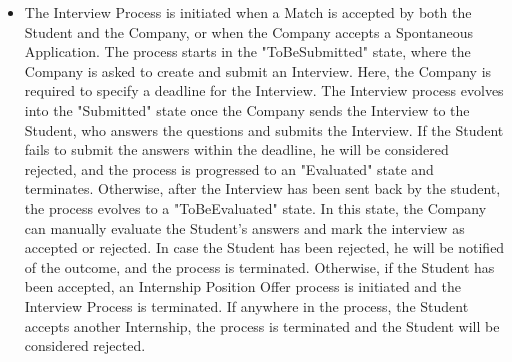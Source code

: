 \begin{itemize}
    \item The Interview Process is initiated when a Match is accepted by both the Student and the Company, or when the Company accepts a Spontaneous Application. The process starts in the "ToBeSubmitted" state, where the Company is asked to create and submit an Interview. Here, the Company is required to specify a deadline for the Interview. The Interview process evolves into the "Submitted" state once the Company sends the Interview to the Student, who answers the questions and submits the Interview. If the Student fails to submit the answers within the deadline, he will be considered rejected, and the process is progressed to an "Evaluated" state and terminates. Otherwise, after the Interview has been sent back by the student, the process evolves to a "ToBeEvaluated" state. In this state, the Company can manually evaluate the Student's answers and mark the interview as accepted or rejected. In case the Student has been rejected, he will be notified of the outcome, and the process is terminated. Otherwise, if the Student has been accepted, an Internship Position Offer process is initiated and the Interview Process is terminated. If anywhere in the process, the Student accepts another Internship, the process is terminated and the Student will be considered rejected.
\end{itemize}

